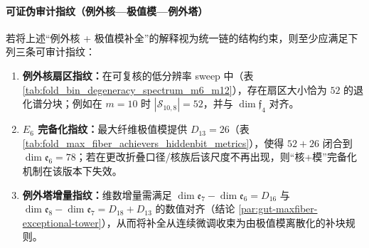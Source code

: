 \paragraph{可证伪审计指纹（例外核—极值模—例外塔）}\label{par:gut-exceptional-fingerprint}
若将上述“例外核 + 极值模补全”的解释视为统一链的结构约束，则至少应满足下列三条可审计指纹：
\begin{enumerate}
  \item \textbf{例外核扇区指纹：}在可复核的低分辨率 sweep 中（表 \ref{tab:fold_bin_degeneracy_spectrum_m6_m12}），存在扇区大小恰为 \(52\) 的退化谱分块；例如在 \(m=10\) 时 \(|\mathcal{S}_{10,8}|=52\)，并与 \(\dim\mathfrak{f}_4\) 对齐。
  \item \textbf{\texorpdfstring{$E_6$}{E6} 完备化指纹：}最大纤维极值模提供 \(D_{13}=26\)（表 \ref{tab:fold_max_fiber_achievers_hiddenbit_metrics}），使得 \(52+26\) 闭合到 \(\dim\mathfrak{e}_6=78\)；若在更改折叠口径/核族后该尺度不再出现，则“核+模”完备化机制在该版本下失效。
  \item \textbf{例外塔增量指纹：}维数增量需满足
  \(\dim\mathfrak{e}_7-\dim\mathfrak{e}_6=D_{16}\) 与 \(\dim\mathfrak{e}_8-\dim\mathfrak{e}_7=D_{18}+D_{13}\) 的数值对齐（结论 \ref{par:gut-maxfiber-exceptional-tower}），从而将补全从连续微调收束为由极值模离散化的补块规则。
\end{enumerate}

